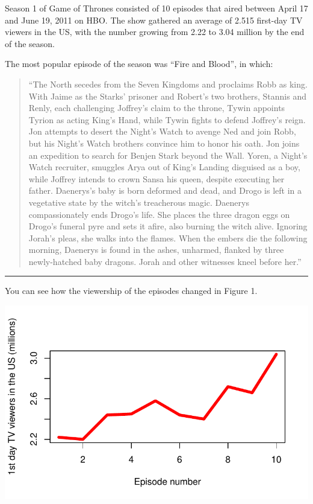 \documentclass[
  letterpaper,
  DIV=11,
  numbers=noendperiod]{scrartcl}
\begin{document}
Season 1 of Game of Thrones consisted of 10 episodes that aired between
April 17 and June 19, 2011 on HBO. The show gathered an average of 2.515
first-day TV viewers in the US, with the number growing from 2.22 to
3.04 million by the end of the season.

The most popular episode of the season was ``Fire and Blood'', in which:

\begin{quote}
``The North secedes from the Seven Kingdoms and proclaims Robb as king.
With Jaime as the Starks' prisoner and Robert's two brothers, Stannis
and Renly, each challenging Joffrey's claim to the throne, Tywin
appoints Tyrion as acting King's Hand, while Tywin fights to defend
Joffrey's reign. Jon attempts to desert the Night's Watch to avenge Ned
and join Robb, but his Night's Watch brothers convince him to honor his
oath. Jon joins an expedition to search for Benjen Stark beyond the
Wall. Yoren, a Night's Watch recruiter, smuggles Arya out of King's
Landing disguised as a boy, while Joffrey intends to crown Sansa his
queen, despite executing her father. Daenerys's baby is born deformed
and dead, and Drogo is left in a vegetative state by the witch's
treacherous magic. Daenerys compassionately ends Drogo's life. She
places the three dragon eggs on Drogo's funeral pyre and sets it afire,
also burning the witch alive. Ignoring Jorah's pleas, she walks into the
flames. When the embers die the following morning, Daenerys is found in
the ashes, unharmed, flanked by three newly-hatched baby dragons. Jorah
and other witnesses kneel before her.''
\end{quote}

\begin{center}\rule{0.5\linewidth}{0.5pt}\end{center}

You can see how the viewership of the episodes changed in Figure 1.

\includegraphics{QMD_Assignment_QM2_files/figure-pdf/viewers_plot-1.pdf}
\end{document}
